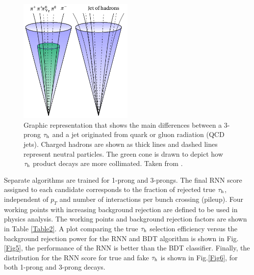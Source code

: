 \begin{figure}[h]
	\centering
	\includegraphics[width=0.5\textwidth]{figures/Fig4}
	\caption{Graphic representation that shows the main differences between a 3-prong $\tau_\text{h}$ and a jet originated from quark or gluon radiation (QCD jets). Charged hadrons are shown as thick lines and dashed lines represent neutral particles. The green cone is drawn to depict how $\tau_\text{h}$ product decays are more collimated. Taken from \cite{SamImage}.}
	\label{Fig4}
\end{figure}
Separate algorithms are trained for 1-prong and 3-prongs. The final RNN score assigned to each candidate corresponds to the fraction of rejected true $\tau_\text{h}$, independent of $p_T$ and number of interactions per bunch crossing (pileup). Four working points with increasing background rejection are defined to be used in physics analysis. The working points and background rejection factors are shown in Table \ref{Table2}. A plot comparing the true $\tau_\text{h}$ selection efficiency versus the background rejection power for the RNN and BDT algorithm is shown in Fig.\ref{Fig5}, the performance of the RNN is better than the BDT classifier. Finally, the distribution for the RNN score for true and fake $\tau_\text{h}$ is shown in Fig.\ref{Fig6}, for both 1-prong and 3-prong decays.
